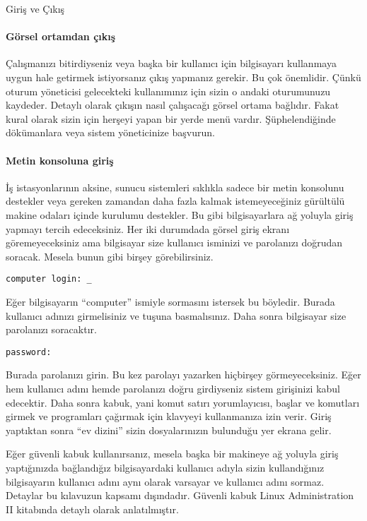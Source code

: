 \begin{section}{Giriş ve Çıkış}
\paragraph{Görsel ortamdan çıkış}{Çalışmanızı bitirdiyseniz veya başka bir kullanıcı için bilgisayarı kullanmaya uygun hale getirmek istiyorsanız çıkış yapmanız gerekir. Bu çok önemlidir. Çünkü oturum yöneticisi gelecekteki kullanımınız için sizin o andaki oturumunuzu kaydeder. Detaylı olarak çıkışın nasıl çalışacağı görsel ortama bağlıdır. Fakat kural olarak sizin için herşeyi yapan bir yerde menü vardır. Şüphelendiğinde dökümanlara veya sistem yöneticinize başvurun.}

\paragraph{Metin konsoluna giriş}{İş istasyonlarının aksine, sunucu sistemleri sıklıkla sadece bir metin konsolunu destekler veya gereken zamandan daha fazla kalmak istemeyeceğiniz gürültülü makine odaları içinde kurulumu destekler. Bu gibi bilgisayarlara ağ yoluyla giriş yapmayı tercih edeceksiniz. Her iki durumdada görsel giriş ekranı göremeyeceksiniz ama bilgisayar size kullanıcı isminizi ve parolanızı doğrudan soracak. Mesela bunun gibi birşey görebilirsiniz.}

\footnotesize
\begin{verbatim}
computer login: _
\end{verbatim}
\normalsize

Eğer bilgisayarın “computer” ismiyle sormasını istersek bu böyledir. Burada kullanıcı adınızı girmelisiniz ve \Return tuşuna basmalısınız. Daha sonra bilgisayar size parolanızı soracaktır. 

\footnotesize
\begin{verbatim}
password:
\end{verbatim}
\normalsize

Burada parolanızı girin. Bu kez parolayı yazarken hiçbirşey görmeyeceksiniz. Eğer hem kullanıcı adını hemde parolanızı doğru girdiyseniz sistem girişinizi kabul edecektir. Daha sonra kabuk, yani komut satırı yorumlayıcısı, başlar ve komutları girmek ve programları çağırmak için klavyeyi kullanmanıza izin verir. Giriş yaptıktan sonra “ev dizini” sizin dosyalarınızın bulunduğu yer ekrana gelir.

Eğer güvenli kabuk kullanırsanız, mesela başka bir makineye ağ yoluyla giriş yaptığınızda bağlandığız bilgisayardaki kullanıcı adıyla sizin kullandığınız bilgisayarın kullanıcı adını aynı olarak varsayar ve kullanıcı adını sormaz. Detaylar bu kılavuzun kapsamı dışındadır. Güvenli kabuk Linux Administration II kitabında detaylı olarak anlatılmıştır.


\end{section}
